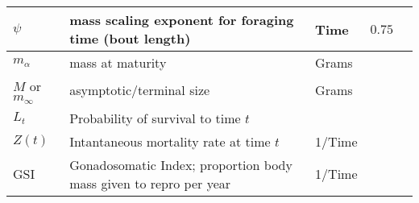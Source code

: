 \documentclass[a4paper]{article} %
\begin{document}
\begin{table}
\begin{tabularx}{\linewidth}{|l|X|l|X|l|}
    $\psi$              & mass scaling exponent for foraging time (bout length)             & Time                      & $0.75$                                        &               \\ \hline
    $m_{\alpha}$        & mass at maturity                                                  & Grams                     &                                               &               \\ \hline
    $M$ or $m_{\infty}$ & asymptotic/terminal size                                          & Grams                     &                                               &               \\ \hline
    $L_t$               & Probability of survival to time $t$                               &                           &                                               &               \\ \hline
    $Z(t)$              & Intantaneous mortality rate at time $t$                           & 1/Time                    &                                               &               \\ \hline
    GSI                 & Gonadosomatic Index; proportion body mass given to repro per year & 1/Time                    &                                               &               \\ \hline
\end{tabularx}
\end{table}
\newpage
\end{document}
